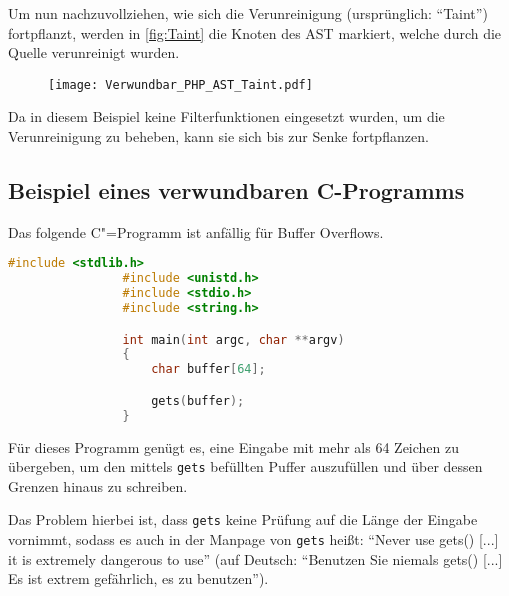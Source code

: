                 Um nun nachzuvollziehen,
                wie sich die Verunreinigung
                (ursprünglich:
                \foreignquote{english}{Taint}) fortpflanzt,
                werden in
                \vref{fig:Taint} die Knoten des
                \gls{AST} markiert,
                welche durch die Quelle verunreinigt wurden.

                \begin{figure}[htp]
                    \centering%
                    \texttt{[image: Verwundbar\_PHP\_AST\_Taint.pdf]}
                    \label{fig:Taint}
                \end{figure}

                Da in diesem Beispiel keine Filterfunktionen eingesetzt wurden,
                um die Verunreinigung zu beheben,
                kann sie sich bis zur Senke fortpflanzen.

        \subsection{Beispiel eines verwundbaren C-Programms}
            Das folgende C"=Programm ist anfällig für Buffer Overflows.

            \begin{lstlisting}[caption={Verwundbar für Buffer Overflows}, label={lst:Buffer_Overflows}, gobble=16, language=c]
                #include <stdlib.h>
                #include <unistd.h>
                #include <stdio.h>
                #include <string.h>

                int main(int argc, char **argv)
                {
                    char buffer[64];

                    gets(buffer);
                }
            \end{lstlisting}

            Für dieses Programm genügt es,
            eine Eingabe mit mehr als 64 Zeichen zu übergeben,
            um den mittels
            \lstinline{gets} befüllten Puffer auszufüllen und
            über dessen Grenzen hinaus zu schreiben.

            Das Problem hierbei ist,
            dass
            \lstinline{gets} keine Prüfung auf die Länge der Eingabe vornimmt,
            sodass es auch in der Manpage von
            \lstinline{gets} heißt:
            \foreignquote{english}{Never use gets()
            [...] it is extremely dangerous to use}
            (auf Deutsch:
            \enquote{Benutzen Sie niemals gets()
            [...] Es ist extrem gefährlich,
            es zu benutzen}).

